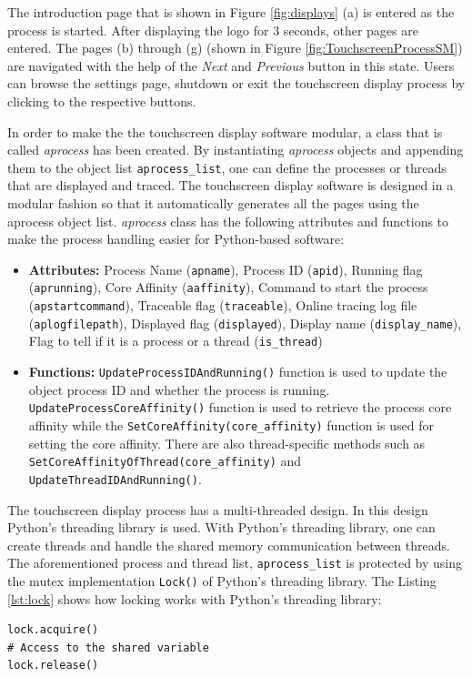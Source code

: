 The introduction page that is shown in Figure \ref{fig:displays} (a) is entered as the process is started. After displaying the logo for 3 seconds, other pages are entered. The pages (b) through (g) (shown in Figure \ref{fig:TouchscreenProcessSM}) are navigated with the help of the \textit{Next} and \textit{Previous} button in this state. Users can browse the settings page, shutdown or exit the touchscreen display process by clicking to the respective buttons.

In order to make the the touchscreen display software modular, a class that is called \textit{aprocess} has been created. By instantiating \textit{aprocess} objects and appending them to the object list \texttt{aprocess\texttt{\_}list}, one can define the processes or threads that are displayed and traced. The touchscreen display software is designed in a modular fashion so that it automatically generates all the pages using the aprocess object list. \textit{aprocess} class has the following attributes and functions to make the process handling easier for Python-based software:

\begin{itemize}
	\item \textbf{Attributes:} Process Name (\texttt{apname}), Process ID (\texttt{apid}), Running flag (\texttt{aprunning}), Core Affinity (\texttt{aaffinity}), Command to start the process (\texttt{apstartcommand}), Traceable flag (\texttt{traceable}), Online tracing log file (\texttt{aplogfilepath}), Displayed flag (\texttt{displayed}), Display name (\texttt{display\_name}), Flag to tell if it is a process or a thread (\texttt{is\_thread})
	\item \textbf{Functions:} \texttt{UpdateProcessIDAndRunning()} function is used to update the object process ID and whether the process is running. \texttt{UpdateProcessCoreAffinity()} function is used to retrieve the process core affinity while the  \texttt{SetCoreAffinity(core\_affinity)} function is used for setting the core affinity. There are also thread-specific methods such as \texttt{SetCoreAffinityOfThread(core\_affinity)} and \texttt{UpdateThreadIDAndRunning()}.
\end{itemize}

The touchscreen display process has a multi-threaded design. In this design Python's threading library \cite{pythonthreading} is used. With Python's threading library, one can create threads and handle the shared memory communication between threads. The aforementioned process and thread list, \texttt{aprocess{\_}list} is protected by using the mutex implementation \texttt{Lock()} \cite{pythonthreading} of Python's threading library. The Listing \ref{lst:lock} shows how locking works with Python's threading library:
\begin{lstlisting}[caption={Using locks in Python},label={lst:lock},style=python]
lock.acquire()
# Access to the shared variable
lock.release()
\end{lstlisting}


